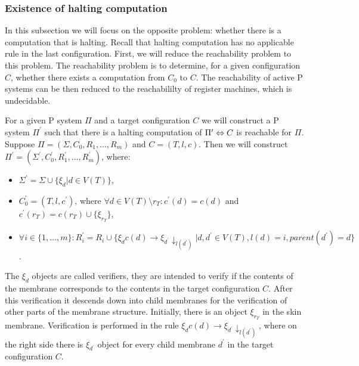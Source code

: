 
\subsubsection{Existence of halting computation} %
\label{ssub:existence_of_halting_computation}

In this subsection we will focus on the opposite problem: whether there is a computation that is halting. Recall that halting computation has no applicable rule in the last configuration.
First, we will reduce the reachability problem to this problem. The reachability problem is to determine, for a given configuration $C$, whether there exists a computation from $C_0$ to $C$. The reachability of active P systems can be then reduced to the reachabililty of register machines, which is undecidable.

For a given P system $\Pi$ and a target configuration $C$ we will construct a P system $\Pi^\prime$ such that there is a halting computation of $\Pi^\prime\Leftrightarrow\linebreak C$ is reachable for $\Pi$. Suppose $\Pi = (\Sigma, C_0, R_1, \ldots, R_m)$ and $C = (T, l, c)$. Then we will construct $\Pi^\prime = (\Sigma^\prime, C_0^\prime, R_1^\prime, \ldots, R_m^\prime)$, where:

\begin{itemize}
  \item $\Sigma^\prime = \Sigma\cup\{\xi_d|d\in V(T)\}$,
  \item $C_0^\prime = (T, l, c^\prime)$, where $\forall d\in V(T)\setminus r_T: c^\prime(d) = c(d)$ and $c^\prime(r_T) = c(r_T)\cup\{\xi_{r_T}\}$,
  \item $\forall i\in\{1,\ldots, m\}: R_i^\prime = R_i\cup\{\xi_d c(d)\rightarrow\xi_{d^\prime}\downarrow_{l(d^\prime)}|d,d^\prime\in V(T),l(d)=i,parent(d^\prime)=d\}$.
\end{itemize}

The $\xi_d$ objects are called verifiers, they are intended to verify if the contents of the membrane corresponds to the contents in the target configuration $C$. After this verification it descends down into child membranes for the verification of other parts of the membrane structure.
Initially, there is an object $\xi_{r_T}$ in the skin membrane. Verification is performed in the rule $\xi_d c(d)\rightarrow\xi_{d^\prime}\downarrow_{l(d^\prime)}$, where on the right side there is $\xi_{d^\prime}$ object for every child membrane $d^\prime$ in the target configuration $C$.

